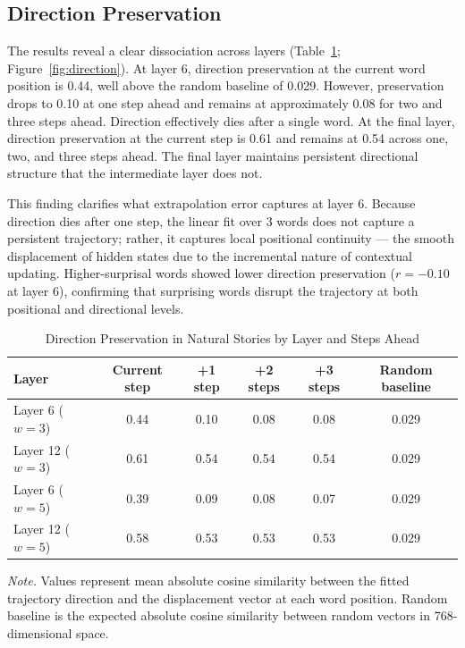 \documentclass[12pt]{article}
\begin{document}
\subsection{Direction Preservation}

The results reveal a clear dissociation across layers (Table~\ref{tab:direction}; Figure~\ref{fig:direction}). At layer 6, direction preservation at the current word position is 0.44, well above the random baseline of 0.029. However, preservation drops to 0.10 at one step ahead and remains at approximately 0.08 for two and three steps ahead. Direction effectively dies after a single word. At the final layer, direction preservation at the current step is 0.61 and remains at 0.54 across one, two, and three steps ahead. The final layer maintains persistent directional structure that the intermediate layer does not.

This finding clarifies what extrapolation error captures at layer 6. Because direction dies after one step, the linear fit over 3 words does not capture a persistent trajectory; rather, it captures local positional continuity --- the smooth displacement of hidden states due to the incremental nature of contextual updating. Higher-surprisal words showed lower direction preservation ($r = -0.10$ at layer 6), confirming that surprising words disrupt the trajectory at both positional and directional levels.

\begin{table}[!htbp]
\centering
\caption{Direction Preservation in Natural Stories by Layer and Steps Ahead}
\label{tab:direction}
\begin{tabular}{lccccc}
\toprule
\textbf{Layer} & \textbf{Current step} & \textbf{+1 step} & \textbf{+2 steps} & \textbf{+3 steps} & \textbf{Random baseline} \\
\midrule
Layer 6 ($w = 3$) & 0.44 & 0.10 & 0.08 & 0.08 & 0.029 \\
Layer 12 ($w = 3$) & 0.61 & 0.54 & 0.54 & 0.54 & 0.029 \\
Layer 6 ($w = 5$) & 0.39 & 0.09 & 0.08 & 0.07 & 0.029 \\
Layer 12 ($w = 5$) & 0.58 & 0.53 & 0.53 & 0.53 & 0.029 \\
\bottomrule
\end{tabular}

\smallskip
\footnotesize
\textit{Note.} Values represent mean absolute cosine similarity between the fitted trajectory direction and the displacement vector at each word position. Random baseline is the expected absolute cosine similarity between random vectors in 768-dimensional space.
\end{table}
\end{document}
